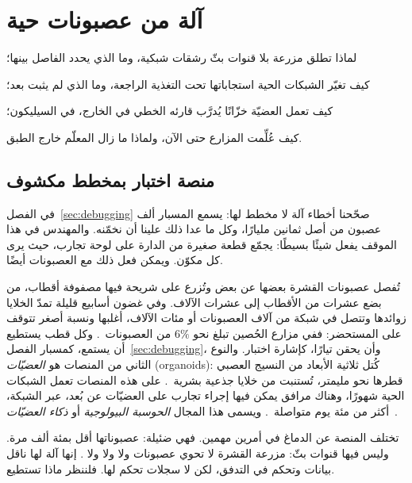 \chapter{آلة من عصبونات حية}
\label{sec:livingmachine}
\begin{chaptergoals}
\item لماذا تطلق مزرعة بلا قنوات بثّ رشقات شبكية، وما الذي يحدد الفاصل بينها؛
\item كيف تغيّر الشبكات الحية استجاباتها تحت التغذية الراجعة، وما الذي لم يثبت بعد؛
\item كيف تعمل العضيّة خزّانًا يُدرَّب قارئه الخطي في الخارج، في السيليكون؛
\item كيف عُلِّمت المزارع حتى الآن، ولماذا ما زال المعلّم خارج الطبق.
\end{chaptergoals}

\section{منصة اختبار بمخطط مكشوف}

في الفصل~\ref{sec:debugging} صحّحنا أخطاء آلة لا مخطط لها: يسمع المسبار ألف عصبون من أصل ثمانين مليارًا، وكل ما عدا ذلك علينا أن نخمّنه. والمهندس في هذا الموقف يفعل شيئًا بسيطًا: يجمّع قطعة صغيرة من الدارة على لوحة تجارب، حيث يرى كل مكوّن. ويمكن فعل ذلك مع العصبونات أيضًا.

تُفصل عصبونات القشرة بعضها عن بعض وتُزرع على شريحة فيها مصفوفة أقطاب، من بضع عشرات من الأقطاب إلى عشرات الآلاف. وفي غضون أسابيع قليلة تمدّ الخلايا زوائدها وتتصل في شبكة من آلاف العصبونات أو مئات الآلاف، أغلبها  ونسبة أصغر  تتوقف على المستحضر: ففي مزارع الحُصين تبلغ نحو $6\%$ من العصبونات~\cite{Benson1994}. وكل قطب يستطيع أن يستمع، كمسبار الفصل~\ref{sec:debugging}، وأن يحقن تيارًا، كإشارة اختبار. والنوع الثاني من المنصات هو \emph{العضيّات} (\foreignlanguage{english}{organoids}): كُتل ثلاثية الأبعاد من النسيج العصبي قطرها نحو مليمتر، تُستنبت من خلايا جذعية بشرية~\cite{Lancaster2013}. على هذه المنصات تعمل الشبكات الحية شهورًا، وهناك مرافق يمكن فيها إجراء تجارب على العضيّات عن بُعد، عبر الشبكة، أكثر من مئة يوم متواصلة~\cite{Jordan2024}. ويسمى هذا المجال \emph{الحوسبة البيولوجية} أو \emph{ذكاء العضيّات}~\cite{Smirnova2023}.

تختلف المنصة عن الدماغ في أمرين مهمين. فهي ضئيلة: عصبوناتها أقل بمئة ألف مرة. وليس فيها قنوات بثّ: مزرعة القشرة لا تحوي عصبونات  ولا  ولا  ولا . إنها آلة لها ناقل بيانات وتحكم في التدفق، لكن لا سجلات تحكم لها. فلننظر ماذا تستطيع.

